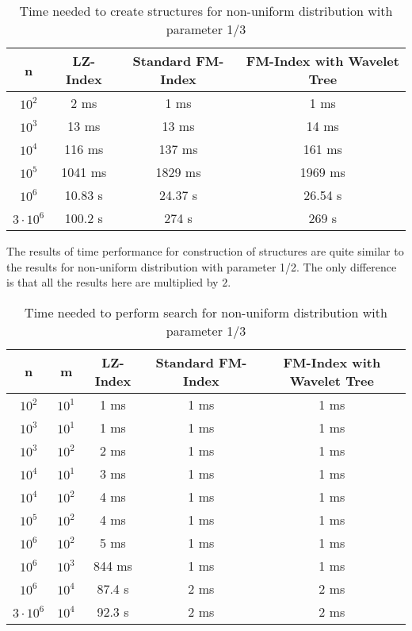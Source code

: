 \begin{table}[H]
\begin{center}
\caption{Time needed to create structures for non-uniform distribution with parameter 1/3}
\begin{tabular}{|c|c|c|c|}
\hline
\rowcolor[HTML]{C0C0C0}
n & LZ-Index & Standard FM-Index & FM-Index with Wavelet Tree \\ \hline
$10^{2}$ & 2 ms & 1 ms & 1 ms \\ \hline
$10^{3}$ & 13 ms & 13 ms & 14 ms \\ \hline
$10^{4}$ & 116 ms & 137 ms & 161 ms \\ \hline
$10^{5}$ & 1041 ms & 1829 ms & 1969 ms \\ \hline
$10^{6}$ & 10.83 s & 24.37 s & 26.54 s \\ \hline
$3 \cdot 10^{6}$ & 100.2 s & 274 s & 269 s \\ \hline
\end{tabular}
\end{center}
\end{table}

The results of time performance for construction of structures are quite similar to the results for non-uniform distribution with parameter 1/2. The only difference is that all the results here are multiplied by $2$.

\begin{table}[H]
\begin{center}
\caption{Time needed to perform search for non-uniform distribution with parameter 1/3}
\begin{tabular}{|c|c|c|c|c|}
\hline
\rowcolor[HTML]{C0C0C0}
n & m & LZ-Index & Standard FM-Index & FM-Index with Wavelet Tree \\ \hline
$10^{2}$ & $10^{1}$ & 1 ms & 1 ms & 1 ms \\ \hline
$10^{3}$ & $10^{1}$ & 1 ms & 1 ms & 1 ms \\ \hline
$10^{3}$ & $10^{2}$ & 2 ms & 1 ms & 1 ms \\ \hline
$10^{4}$ & $10^{1}$ & 3 ms & 1 ms & 1 ms \\ \hline
$10^{4}$ & $10^{2}$ & 4 ms & 1 ms & 1 ms \\ \hline
$10^{5}$ & $10^{2}$ & 4 ms & 1 ms & 1 ms \\ \hline
$10^{6}$ & $10^{2}$ & 5 ms & 1 ms & 1 ms \\ \hline
$10^{6}$ & $10^{3}$ & 844 ms & 1 ms & 1 ms \\ \hline
$10^{6}$ & $10^{4}$ & 87.4 s & 2 ms & 2 ms \\ \hline
$3 \cdot 10^{6}$ & $10^{4}$ & 92.3 s & 2 ms & 2 ms \\ \hline
\end{tabular}
\end{center}
\end{table}

